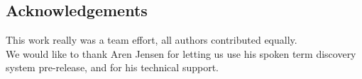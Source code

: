 \documentclass[final]{beamer}
\begin{document}
\begin{frame}[t]
\begin{multicols}{3}

\nocite{*} %


\section{Acknowledgements}

This work really was a team effort, all authors contributed equally.\\
We would like to thank Aren Jensen for letting us use his spoken term discovery system pre-release, and for his technical support.


\end{multicols}

\end{frame}
\end{document}
